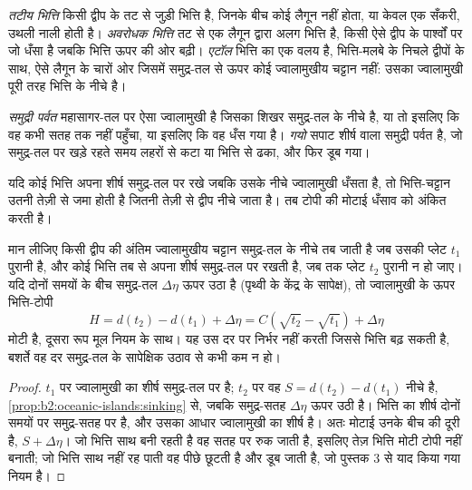 \begin{definition}[तटीय भित्ति; अवरोधक भित्ति; एटॉल]\label{def:b2:oceanic-islands:reefs}
\emph{तटीय भित्ति} किसी द्वीप के तट से जुड़ी भित्ति है, जिनके बीच कोई
लैगून नहीं होता, या केवल एक सँकरी, उथली नाली होती है। \emph{अवरोधक भित्ति}
तट से एक लैगून द्वारा अलग भित्ति है, किसी ऐसे द्वीप के पार्श्वों पर जो धँसा है जबकि
भित्ति ऊपर की ओर बढ़ी। \emph{एटॉल} भित्ति का एक वलय है, भित्ति-मलबे के निचले द्वीपों के साथ,
ऐसे लैगून के चारों ओर जिसमें समुद्र-तल से ऊपर कोई ज्वालामुखीय चट्टान नहीं: उसका ज्वालामुखी पूरी तरह भित्ति के नीचे है।
\end{definition}

\begin{definition}[समुद्री पर्वत; गयो]\label{def:b2:oceanic-islands:seamount}
\emph{समुद्री पर्वत} महासागर-तल पर ऐसा ज्वालामुखी है जिसका शिखर समुद्र-तल
के नीचे है, या तो इसलिए कि वह कभी सतह तक नहीं पहुँचा, या इसलिए कि वह धँस गया है।
\emph{गयो} सपाट शीर्ष वाला समुद्री पर्वत है, जो समुद्र-तल पर खड़े रहते समय लहरों से कटा
या भित्ति से ढका, और फिर डूब गया।
\end{definition}

यदि कोई भित्ति अपना शीर्ष समुद्र-तल पर रखे जबकि उसके नीचे ज्वालामुखी धँसता है, तो भित्ति-चट्टान उतनी
तेज़ी से जमा होती है जितनी तेज़ी से द्वीप नीचे जाता है। तब टोपी की मोटाई धँसाव को अंकित करती है।

\begin{proposition}[भित्ति-टोपी की मोटाई]\label{prop:b2:oceanic-islands:cap}
मान लीजिए किसी द्वीप की अंतिम ज्वालामुखीय चट्टान समुद्र-तल के नीचे तब जाती है जब उसकी प्लेट $t_1$ पुरानी है, और
कोई भित्ति तब से अपना शीर्ष समुद्र-तल पर रखती है, जब तक प्लेट
$t_2$ पुरानी न हो जाए। यदि दोनों समयों के बीच समुद्र-तल
$\Delta\eta$ ऊपर उठा है (पृथ्वी के केंद्र के सापेक्ष), तो ज्वालामुखी के ऊपर भित्ति-टोपी
\[
H = d(t_2) - d(t_1) + \Delta\eta = C\left(\sqrt{t_2} - \sqrt{t_1}\right) + \Delta\eta
\]
मोटी है, दूसरा रूप मूल नियम के साथ। यह उस दर पर निर्भर नहीं करती जिससे भित्ति
बढ़ सकती है, बशर्ते वह दर समुद्र-तल के सापेक्षिक उठाव से कभी कम न हो।
\end{proposition}

\begin{proof}
$t_1$ पर ज्वालामुखी का शीर्ष समुद्र-तल पर है; $t_2$ पर वह $S = d(t_2) - d(t_1)$ नीचे है,
\cref{prop:b2:oceanic-islands:sinking} से, जबकि समुद्र-सतह $\Delta\eta$ ऊपर उठी है। भित्ति का शीर्ष
दोनों समयों पर समुद्र-सतह पर है, और उसका आधार ज्वालामुखी का शीर्ष है। अतः
मोटाई उनके बीच की दूरी है, $S + \Delta\eta$। जो भित्ति साथ बनी रहती है वह
सतह पर रुक जाती है, इसलिए तेज़ भित्ति मोटी टोपी नहीं बनाती; जो भित्ति साथ नहीं रह पाती वह पीछे छूटती है
और डूब जाती है, जो पुस्तक 3 से याद किया गया नियम है।
\end{proof}

